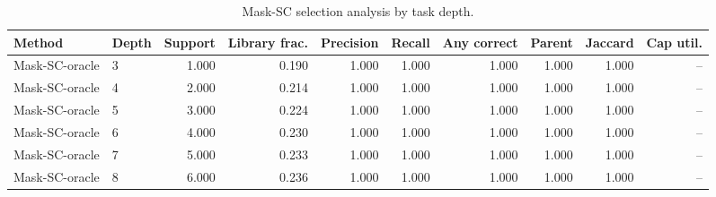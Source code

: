 \begin{table}[ht]
    \caption{Mask-SC selection analysis by task depth.}
    \label{tbl:masksc_selection_depth}
    \centering
    \scriptsize
    \begin{tabular}{llrrrrrrrr}
    \toprule
Method & Depth & Support & Library frac. & Precision & Recall & Any correct & Parent & Jaccard & Cap util. \\
    \midrule
Mask-SC-oracle & 3 & 1.000 & 0.190 & 1.000 & 1.000 & 1.000 & 1.000 & 1.000 & -- \\
Mask-SC-oracle & 4 & 2.000 & 0.214 & 1.000 & 1.000 & 1.000 & 1.000 & 1.000 & -- \\
Mask-SC-oracle & 5 & 3.000 & 0.224 & 1.000 & 1.000 & 1.000 & 1.000 & 1.000 & -- \\
Mask-SC-oracle & 6 & 4.000 & 0.230 & 1.000 & 1.000 & 1.000 & 1.000 & 1.000 & -- \\
Mask-SC-oracle & 7 & 5.000 & 0.233 & 1.000 & 1.000 & 1.000 & 1.000 & 1.000 & -- \\
Mask-SC-oracle & 8 & 6.000 & 0.236 & 1.000 & 1.000 & 1.000 & 1.000 & 1.000 & -- \\
    \bottomrule
    \end{tabular}
\end{table}
